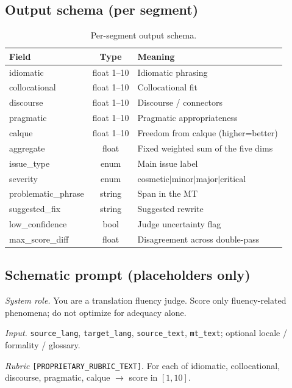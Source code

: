 \documentclass[11pt]{article}
\begin{document}
\subsection{Output schema (per segment)}

\begin{table}[t]
\centering
\scriptsize
\caption{Per-segment output schema.}
\label{tab:schema}
\begin{tabularx}{\columnwidth}{>{\raggedright\arraybackslash}Xc>{\raggedright\arraybackslash}X}
\toprule
Field & Type & Meaning \\
\midrule
idiomatic & float 1--10 & Idiomatic phrasing \\
collocational & float 1--10 & Collocational fit \\
discourse & float 1--10 & Discourse / connectors \\
pragmatic & float 1--10 & Pragmatic appropriateness \\
calque & float 1--10 & Freedom from calque (higher=better) \\
aggregate & float & Fixed weighted sum of the five dims \\
issue\_type & enum & Main issue label \\
severity & enum & cosmetic$|$minor$|$major$|$critical \\
problematic\_phrase & string & Span in the MT \\
suggested\_fix & string & Suggested rewrite \\
low\_confidence & bool & Judge uncertainty flag \\
max\_score\_diff & float & Disagreement across double-pass \\
\bottomrule
\end{tabularx}

\end{table}


\subsection{Schematic prompt (placeholders only)}
\textit{System role.} You are a translation fluency judge. Score only
fluency-related phenomena; do not optimize for adequacy alone.

\textit{Input.} \texttt{source\_lang}, \texttt{target\_lang}, \texttt{source\_text},
\texttt{mt\_text}; optional locale / formality / glossary.

\textit{Rubric} \texttt{[PROPRIETARY\_RUBRIC\_TEXT]}.
For each of idiomatic, collocational, discourse, pragmatic, calque $\rightarrow$
score in $[1,10]$.
\end{document}
